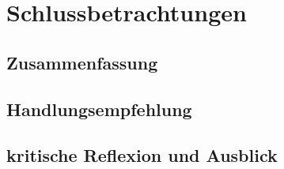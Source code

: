\chapter{Schlussbetrachtungen}

\section{Zusammenfassung}

\section{Handlungsempfehlung}

\section{kritische Reflexion und Ausblick}